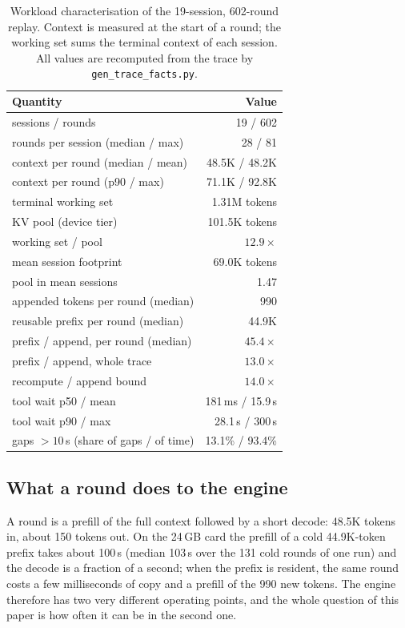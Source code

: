 \begin{table}[t]
\caption{Workload characterisation of the 19-session, 602-round replay. Context is
measured at the start of a round; the working set sums the terminal context of each
session. All values are recomputed from the trace by \texttt{gen\_trace\_facts.py}.}
\label{tab:workload}
\centering
\small
\begin{tabular}{@{}lr@{}}
\toprule
Quantity & Value \\
\midrule
sessions / rounds & 19 / 602 \\
rounds per session (median / max) & 28 / 81 \\
context per round (median / mean) & 48.5K / 48.2K \\
context per round (p90 / max) & 71.1K / 92.8K \\
terminal working set & 1.31M tokens \\
KV pool (device tier) & 101.5K tokens \\
working set / pool & $12.9\times$ \\
mean session footprint & 69.0K tokens \\
pool in mean sessions & 1.47 \\
appended tokens per round (median) & 990 \\
reusable prefix per round (median) & 44.9K \\
prefix / append, per round (median) & $45.4\times$ \\
prefix / append, whole trace & $13.0\times$ \\
recompute / append bound & $14.0\times$ \\
tool wait p50 / mean & 181\,ms / 15.9\,s \\
tool wait p90 / max & 28.1\,s / 300\,s \\
gaps $>10$\,s (share of gaps / of time) & 13.1\% / 93.4\% \\
\bottomrule
\end{tabular}
\end{table}

\subsection{What a round does to the engine}

A round is a prefill of the full context followed by a short decode: 48.5K tokens in,
about 150 tokens out. On the 24\,GB card the prefill of a cold 44.9K-token prefix takes
about 100\,s (median 103\,s over the 131 cold rounds of one run) and the decode is a fraction of a second; when the
prefix is resident, the same round costs a few milliseconds of copy and a prefill of the
990 new tokens. The engine therefore has two very different operating points, and the
whole question of this paper is how often it can be in the second one.

